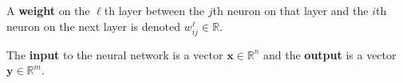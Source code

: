 \documentclass{beamer}
\def\layersep{2cm}
\begin{document}
\begin{frame}
\begin{figure}
        \end{figure}

        \begin{definition}
          A \textbf{weight} on the $\ell$th layer between the $j$th neuron on that layer and
          the $i$th neuron on the next layer is denoted $w^{\ell}_{ij} \in \mathbb{R}.$
        \end{definition}
        \begin{definition}
          The \textbf{input} to the neural network is a vector $\pmb x \in \mathbb{R}^n$ and the
          \textbf{output} is a vector $\pmb y \in \mathbb{R}^m.$
        \end{definition}
    \end{frame}
\end{document}
